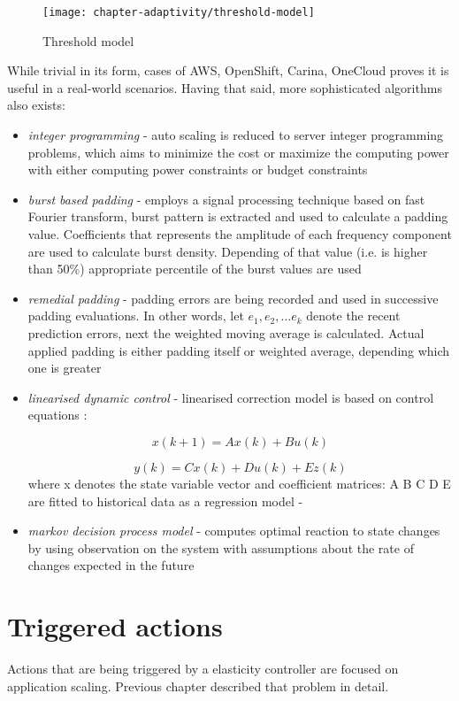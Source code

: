 \begin{figure}[!ht]
  \begin{center}
    \texttt{[image: chapter-adaptivity/threshold-model]}
  \end{center}
  \caption{Threshold model}
  \label{fig:threshold-model}
\end{figure}

While trivial in its form, cases of AWS, OpenShift, Carina, OneCloud proves it is useful in a real-world scenarios. Having that said, more sophisticated algorithms also exists:
\begin{itemize}
  \item \textit{integer programming} - auto scaling is reduced to server integer programming problems, which aims to minimize the cost or maximize the computing power with either computing power constraints or
budget constraints \cite{MaLiHu10}
  \item \textit{burst based padding} - employs a signal processing technique based on fast Fourier transform, burst pattern is extracted and used to calculate a padding value. Coefficients that represents the amplitude of each frequency component are used to calculate burst density. Depending of that value (i.e. is higher than 50\%) appropriate percentile of the burst values are used \cite{ShSuGuWi11}  
  \item \textit{remedial padding} - padding errors are being recorded and used in successive padding evaluations. In other words, let $e_1, e_2, ... e_k$ denote the recent prediction errors, next the weighted moving average is calculated. Actual applied padding is either padding itself or weighted average, depending which one is greater \cite{ShSuGuWi11}    
  \item \textit{linearised dynamic control} - linearised correction model is based on control equations \cite{AbShBh02}:
  
    \begin{equation}
      x(k+1)=Ax(k)+Bu(k)
    \end{equation}
    
    \begin{equation}
       y(k) = C x(k) + D u(k) + E z(k)
    \end{equation}
    where x denotes the state variable vector and coefficient matrices: A B C D E are fitted to historical data as a regression model - \cite{DiLuFrHePa03}

  \item \textit{markov decision process model} - computes optimal reaction to state changes by using observation on the system with assumptions about the rate of changes expected in the future \cite{AbWo02}
\end{itemize}

\section{Triggered actions}
Actions that are being triggered by a elasticity controller are focused on application scaling. Previous chapter described that problem in detail.



